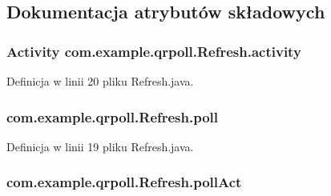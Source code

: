 \subsection{Dokumentacja atrybutów składowych}
\hypertarget{classcom_1_1example_1_1qrpoll_1_1_refresh_aa3e22cc50197adde6465dd4cb0ce8db5}{
\subsubsection[{activity}]{\setlength{\rightskip}{0pt plus 5cm}Activity com.\+example.\+qrpoll.\+Refresh.\+activity\hspace{0.3cm}{\ttfamily [private]}}}\label{classcom_1_1example_1_1qrpoll_1_1_refresh_aa3e22cc50197adde6465dd4cb0ce8db5}


Definicja w linii 20 pliku Refresh.\+java.

\hypertarget{classcom_1_1example_1_1qrpoll_1_1_refresh_a72a1aeb64069e0a0579733c97bb211b3}{
\subsubsection[{poll}]{ com.\+example.\+qrpoll.\+Refresh.\+poll\hspace{0.3cm}{\ttfamily [private]}}}\label{classcom_1_1example_1_1qrpoll_1_1_refresh_a72a1aeb64069e0a0579733c97bb211b3}


Definicja w linii 19 pliku Refresh.\+java.

\hypertarget{classcom_1_1example_1_1qrpoll_1_1_refresh_aa893ac7b613b4da5a7a29dfc3a1bea87}{
\subsubsection[{poll\+Act}]{ com.\+example.\+qrpoll.\+Refresh.\+poll\+Act\hspace{0.3cm}{\ttfamily [private]}}}\label{classcom_1_1example_1_1qrpoll_1_1_refresh_aa893ac7b613b4da5a7a29dfc3a1bea87}


